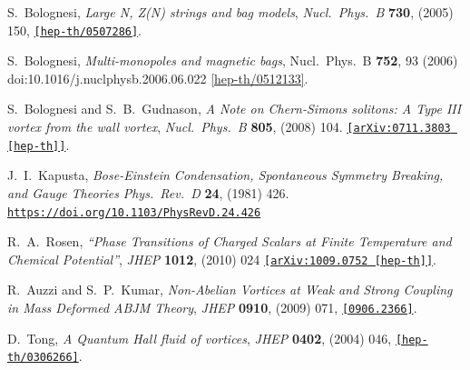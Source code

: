 \begin{thebibliography}{99}
  S.~Bolognesi,
  {\it Large N, Z(N) strings and bag models},
  {\it Nucl.\ Phys.\ B} {\bf 730}, (2005) 150, 
 \href{https://arxiv.org/abs/hep-th/0507286}{\tt [hep-th/0507286]}.

  S.~Bolognesi,
  {\it Multi-monopoles and magnetic bags},
  Nucl.\ Phys.\ B {\bf 752}, 93 (2006)
  doi:10.1016/j.nuclphysb.2006.06.022
  \href{https://arxiv.org/abs/hep-th/0512133}{[hep-th/0512133]}.

  S.~Bolognesi and S.~B.~Gudnason,
  {\it A Note on Chern-Simons solitons: A Type III vortex from the wall vortex},
  {\it Nucl.\ Phys.\ B} {\bf 805}, (2008) 104.
  \href{https://arxiv.org/abs/0711.3803}{\tt [arXiv:0711.3803 [hep-th]]}.

 
  
  J.~I.~Kapusta,
  {\it Bose-Einstein Condensation, Spontaneous Symmetry Breaking, and Gauge Theories}
  {\it Phys.\ Rev.\ D} {\bf 24}, (1981) 426.
  \href{https://doi.org/10.1103/PhysRevD.24.426}{\tt https://doi.org/10.1103/PhysRevD.24.426}
 
 R.~A.~Rosen,
 {\it ``Phase Transitions of Charged Scalars at Finite Temperature and Chemical Potential''},
 {\it JHEP} {\bf 1012}, (2010) 024 
\href{https://arxiv.org/abs/1009.0752}{\tt [arXiv:1009.0752 [hep-th]]}.

  R.~Auzzi and S.~P.~Kumar,
  {\it Non-Abelian Vortices at Weak and Strong Coupling in Mass Deformed ABJM Theory}, 
  {\it JHEP} {\bf 0910}, (2009) 071,
 \href{https://arxiv.org/abs/0906.2366}{\tt[0906.2366]}.


  D.~Tong,
  {\it A Quantum Hall fluid of vortices},
  {\it JHEP} {\bf 0402}, (2004) 046, 
  \href{https://arxiv.org/abs/hep-th/0306266}{\tt[hep-th/0306266]}.
  
  
   
   
  


 \end{thebibliography}
